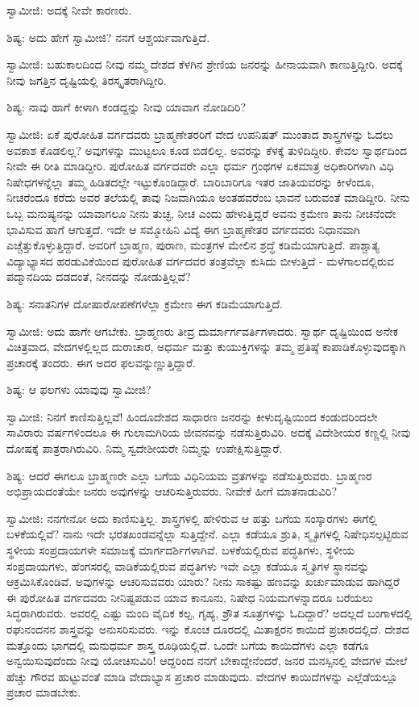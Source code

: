 ಸ್ವಾಮೀಜಿ: ಅದಕ್ಕೆ ನೀವೇ ಕಾರಣರು.

ಶಿಷ್ಯ: ಅದು ಹೇಗೆ ಸ್ವಾಮೀಜಿ? ನನಗೆ ಆಶ್ಚರ್ಯವಾಗುತ್ತಿದೆ.

ಸ್ವಾಮೀಜಿ: ಬಹುಕಾಲದಿಂದ ನೀವು ನಮ್ಮ ದೇಶದ ಕೆಳಗಿನ ಶ್ರೇಣಿಯ ಜನರನ್ನು ಹೀನಾಯವಾಗಿ ಕಾಣುತ್ತಿದ್ದೀರಿ. ಅದಕ್ಕೆ ನೀವು ಜಗತ್ತಿನ ದೃಷ್ಟಿಯಲ್ಲಿ ತಿರಸ್ಕೃತರಾಗಿದ್ದೀರಿ.

ಶಿಷ್ಯ: ನಾವು ಹಾಗೆ ಕೀಳಾಗಿ ಕಂಡದ್ದನ್ನು ನೀವು ಯಾವಾಗ ನೋಡಿದಿರಿ?

ಸ್ವಾಮೀಜಿ: ಏಕೆ ಪುರೋಹಿತ ವರ್ಗದವರು ಬ್ರಾಹ್ಮಣೇತರರಿಗೆ ವೇದ ಉಪನಿಷತ್ ಮುಂತಾದ ಶಾಸ್ತ್ರಗಳನ್ನು ಓದಲು ಅವಕಾಶ ಕೊಡಲಿಲ್ಲ? ಅವುಗಳನ್ನು ಮುಟ್ಟಲೂ ಕೂಡ ಬಿಡಲಿಲ್ಲ. ಅವರನ್ನು ಕೆಳಕ್ಕೆ ತುಳಿದಿದ್ದೀರಿ. ಕೇವಲ ಸ್ವಾರ್ಥದಿಂದ ನೀವೇ ಈ ರೀತಿ ಮಾಡಿದ್ದೀರಿ. ಪುರೋಹಿತ ವರ್ಗದವರೇ ಎಲ್ಲಾ ಧರ್ಮ ಗ್ರಂಥಗಳ ಏಕಮಾತ್ರ ಅಧಿಕಾರಿಗಳಾಗಿ ವಿಧಿ ನಿಷೇಧಗಳನ್ನೆಲ್ಲಾ ತಮ್ಮ ಹಿಡಿತದಲ್ಲೇ ಇಟ್ಟುಕೊಂಡಿದ್ದಾರೆ. ಬಾರಿಬಾರಿಗೂ ಇತರ ಜಾತಿಯವರನ್ನು ಕೀಳೆಂದೂ, ನೀಚರೆಂದೂ ಕರೆದು ಅವರ ತಲೆಯಲ್ಲಿ ತಾವು ನಿಜವಾಗಿಯೂ ಅಂತಹವರೆಂಬ ಭಾವನೆ ಬರುವಂತೆ ಮಾಡಿದ್ದೀರಿ. ನೀನು ಒಬ್ಬ ಮನುಷ್ಯನನ್ನು ಯಾವಾಗಲೂ ನೀನು ತುಚ್ಛ, ನೀಚ ಎಂದು ಹೇಳುತ್ತಿದ್ದರೆ ಅವನು ಕ್ರಮೇಣ ತಾನು ನೀಚನೆಂದೇ ಭಾವಿಸುವ ಹಾಗೆ ಆಗುತ್ತದೆ. ಇದೇ ಆ ಸಮ್ಮೋಹಿನಿ ವಿದ್ಯೆ  ಈಗ ಬ್ರಾಹ್ಮಣೇತರ ವರ್ಗದವರು ನಿಧಾನವಾಗಿ ಎಚ್ಚೆತ್ತುಕೊಳ್ಳುತ್ತಿದ್ದಾರೆ. ಅವರಿಗೆ ಬ್ರಾಹ್ಮಣ, ಪುರಾಣ, ಮಂತ್ರಗಳ ಮೇಲಿನ ಶ್ರದ್ಧೆ ಕಡಿಮೆಯಾಗುತ್ತಿದೆ. ಪಾಶ್ಚಾತ್ಯ ವಿದ್ಯಾಭ್ಯಾಸದ ಹರಡುವಿಕೆಯಿಂದ ಪುರೋಹಿತ ವರ್ಗದವರ ತಂತ್ರವೆಲ್ಲಾ ಕುಸಿದು ಬೀಳುತ್ತಿದೆ - ಮಳೆಗಾಲದಲ್ಲಿರುವ ಪದ್ಮಾನದಿಯ ದಡದಂತೆ, ನೀನದನ್ನು ನೋಡುತ್ತಿಲ್ಲವೆ?

ಶಿಷ್ಯ: ಸನಾತನಿಗಳ ದೋಷಾರೋಪಣೆಗಳೆಲ್ಲಾ ಕ್ರಮೇಣ ಈಗ ಕಡಿಮೆಯಾಗುತ್ತಿದೆ.

ಸ್ವಾಮೀಜಿ: ಅದು ಹಾಗೇ ಆಗಬೇಕು. ಬ್ರಾಹ್ಮಣರು ತೀವ್ರ ದುರ್ಮಾರ್ಗವರ್ತಿಗಳಾದರು. ಸ್ವಾರ್ಥ ದೃಷ್ಟಿಯಿಂದ ಅನೇಕ ವಿಚಿತ್ರವಾದ, ವೇದಗಳಲ್ಲಿಲ್ಲದ ದುರಾಚಾರ, ಅಧರ್ಮ ಮತ್ತು ಕುಯುಕ್ತಿಗಳನ್ನು ತಮ್ಮ ಪ್ರತಿಷ್ಠೆ ಕಾಪಾಡಿಕೊಳ್ಳುವುದಕ್ಕಾಗಿ ಪ್ರಚಾರಕ್ಕೆ ತಂದರು. ಈಗ ಅದರ ಫಲವನ್ನುಣ್ಣುತ್ತಿದ್ದಾರೆ.

ಶಿಷ್ಯ: ಆ ಫಲಗಳು ಯಾವುವು ಸ್ವಾಮೀಜಿ?

ಸ್ವಾಮೀಜಿ: ನಿನಗೆ ಕಾಣಿಸುತ್ತಿಲ್ಲವೆ! ಹಿಂದೂದೇಶದ ಸಾಧಾರಣ ಜನರನ್ನು ಕೀಳುದೃಷ್ಟಿಯಿಂದ ಕಂಡುದರಿಂದಲೇ ಸಾವಿರಾರು ವರ್ಷಗಳಿಂದಲೂ ಈ ಗುಲಾಮಗಿರಿಯ ಜೀವನವನ್ನು ನಡೆಸುತ್ತಿರುವಿರಿ. ಅದಕ್ಕೆ ವಿದೇಶೀಯರ ಕಣ್ಣಲ್ಲಿ ನೀವು ದೋಷಕ್ಕೆ ಪಾತ್ರರಾಗಿರುವಿರಿ. ನಿಮ್ಮ ಸ್ವದೇಶೀಯರೇ ನಿಮ್ಮನ್ನು ಉಪೇಕ್ಷಿಸುತ್ತಿದ್ದಾರೆ.

ಶಿಷ್ಯ: ಆದರೆ ಈಗಲೂ ಬ್ರಾಹ್ಮಣರೇ ಎಲ್ಲಾ ಬಗೆಯ ವಿಧಿನಿಯಮ ವ್ರತಗಳನ್ನು ನಡೆಸುತ್ತಿರುವರು. ಬ್ರಾಹ್ಮಣರ ಅಭಿಪ್ರಾಯದಂತೆಯೇ ಜನರು ಅವುಗಳನ್ನು ಆಚರಿಸುತ್ತಿರುವರು. ನೀವೇಕೆ ಹೀಗೆ ಮಾತನಾಡುವಿರಿ?

ಸ್ವಾಮೀಜಿ: ನನಗೇನೋ ಅದು ಕಾಣಿಸುತ್ತಿಲ್ಲ. ಶಾಸ್ತ್ರಗಳಲ್ಲಿ ಹೇಳಿರುವ ಆ ಹತ್ತು ಬಗೆಯ ಸಂಸ್ಕಾರಗಳು ಈಗೆಲ್ಲಿ ಬಳಕೆಯಲ್ಲಿವೆ? ನಾನು ಇದೇ ಭರತಖಂಡವನ್ನೆಲ್ಲಾ ಸುತ್ತಿದ್ದೇನೆ. ಎಲ್ಲಾ ಕಡೆಯೂ ಶ್ರುತಿ, ಸ್ಮೃತಿಗಳಲ್ಲಿ ನಿಷೇಧಿಸಲ್ಪಟ್ಟಿರುವ ಸ್ಥಳೀಯ ಸಂಪ್ರದಾಯಗಳೇ ಸಮಾಜಕ್ಕೆ ಮಾರ್ಗದರ್ಶಿಗಳಾಗಿವೆ. ಬಳಕೆಯಲ್ಲಿರುವ ಪದ್ಧತಿಗಳು, ಸ್ಥಳೀಯ ಸಂಪ್ರದಾಯಗಳು, ಹೆಂಗಸರಲ್ಲಿ ವಾಡಿಕೆಯಲ್ಲಿರುವ ಪದ್ಧತಿಗಳು ಇವೇ ಎಲ್ಲಾ ಕಡೆಯೂ ಸ್ಮೃತಿಗಳ ಸ್ಥಾನವನ್ನು ಆಕ್ರಮಿಸಿಕೊಂಡಿವೆ. ಅವುಗಳನ್ನು ಆಚರಿಸುವವರು ಯಾರು? ನೀನು ಸಾಕಷ್ಟು ಹಣವನ್ನು ಖರ್ಚುಮಾಡುವ ಹಾಗಿದ್ದರೆ ಈ ಪುರೋಹಿತ ವರ್ಗದವರು ನೀನಿಷ್ಟಪಡುವ ಯಾವ ಕಾನೂನು, ನಿಷೇಧ ನಿಯಮಗಳನ್ನಾದರೂ ಬರೆಯಲು ಸಿದ್ಧರಾಗಿರುವರು. ಅವರಲ್ಲಿ ಎಷ್ಟು ಮಂದಿ ವೈದಿಕ ಕಲ್ಪ, ಗೃಹ್ಯ, ಶ್ರೌತ ಸೂತ್ರಗಳನ್ನು ಓದಿದ್ದಾರೆ? ಅದಲ್ಲದೆ ಬಂಗಾಳದಲ್ಲಿ ರಘುನಂದನನ ಶಾಸ್ತ್ರವನ್ನು ಅನುಸರಿಸುವರು. ಇನ್ನು ಕೊಂಚ ದೂರದಲ್ಲಿ ಮಿತಾಕ್ಷರನ ಕಾಯಿದೆ ಪ್ರಚಾರದಲ್ಲಿದೆ. ದೇಶದ ಮತ್ತೊಂದು ಭಾಗದಲ್ಲಿ ಮನುಧರ್ಮ ಶಾಸ್ತ್ರ ರೂಢಿಯಲ್ಲಿದೆ. ಒಂದೇ ಬಗೆಯ ಕಾಯಿದೆಗಳು ಎಲ್ಲಾ ಕಡೆಗೂ ಅನ್ವಯಿಸುವುದೆಂದು ನೀವು ಯೋಚಿಸುವಿರಿ! ಆದ್ದರಿಂದ ನನಗೆ ಬೇಕಾದ್ದೇನೆಂದರೆ, ಜನರ ಮನಸ್ಸಿನಲ್ಲಿ ವೇದಗಳ ಮೇಲೆ ಹೆಚ್ಚು ಗೌರವ ಹುಟ್ಟುವಂತೆ ಮಾಡಿ ವೇದಾಭ್ಯಾಸ ಪ್ರಚಾರ ಮಾಡುವುದು. ವೇದಗಳ ಕಾಯಿದೆಗಳನ್ನು ಎಲ್ಲೆಡೆಯಲ್ಲೂ ಪ್ರಚಾರ ಮಾಡಬೇಕು.

